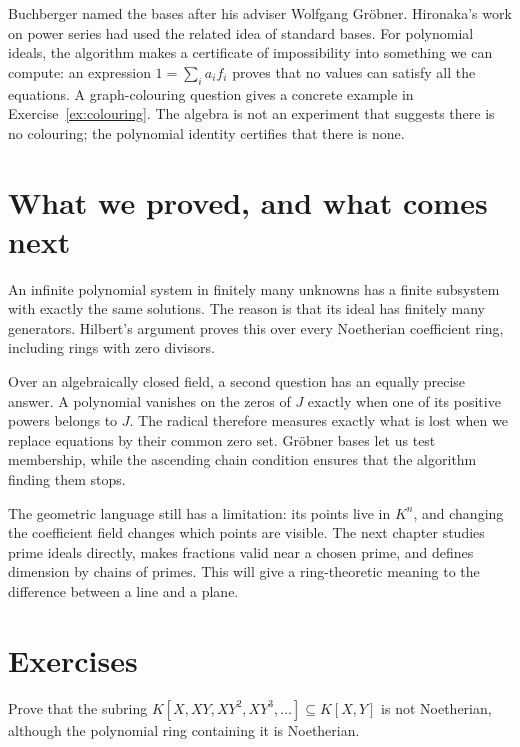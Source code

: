 \begin{beauty}
Buchberger named the bases after his adviser Wolfgang Gröbner. Hironaka's work on power series had used the related idea of standard bases. For polynomial ideals, the algorithm makes a certificate of impossibility into something we can compute: an expression $1=\sum_i a_if_i$ proves that no values can satisfy all the equations. A graph-colouring question gives a concrete example in Exercise~\ref{ex:colouring}. The algebra is not an experiment that suggests there is no colouring; the polynomial identity certifies that there is none.
\end{beauty}

\section{What we proved, and what comes next}

An infinite polynomial system in finitely many unknowns has a finite subsystem with exactly the same solutions. The reason is that its ideal has finitely many generators. Hilbert's argument proves this over every Noetherian coefficient ring, including rings with zero divisors.

Over an algebraically closed field, a second question has an equally precise answer. A polynomial vanishes on the zeros of $J$ exactly when one of its positive powers belongs to $J$. The radical therefore measures exactly what is lost when we replace equations by their common zero set. Gröbner bases let us test membership, while the ascending chain condition ensures that the algorithm finding them stops.

The geometric language still has a limitation: its points live in $K^n$, and changing the coefficient field changes which points are visible. The next chapter studies prime ideals directly, makes fractions valid near a chosen prime, and defines dimension by chains of primes. This will give a ring-theoretic meaning to the difference between a line and a plane.

\section{Exercises}

\begin{exercise}[$\star$]\label{ex:nonnoeth}
Prove that the subring $K[X,XY,XY^2,XY^3,\ldots]\subseteq K[X,Y]$ is not Noetherian, although the polynomial ring containing it is Noetherian.
\end{exercise}

